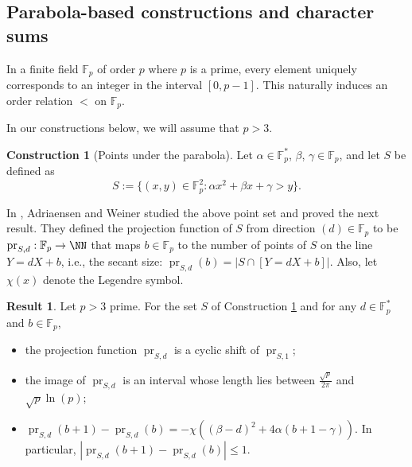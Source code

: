 \documentclass[10pt]{article}
\newcommand{\F}{\mathbb{F}}
\DeclareMathOperator{\pr}{pr}
\theoremstyle{definition}
\newtheorem{construction}[thm]{Construction}
\newtheorem{result}[thm]{Result}
\begin{document}
	\subsection[Parabola-based constructions and character sums]{ {Parabola-based constructions and character sums}}
	
	In a finite field $\F_p$ of order $p$ where $ p$ is a prime, every element uniquely corresponds to an integer in the interval $[0, p-1]$. This naturally induces an order relation $<$ on $\F_p$.
	
	In  our constructions below, we will assume that $p > 3$. %
	
	\begin{construction}[Points under the parabola]\label{parabola}
		Let  $\alpha \in \F^*_p$, $\beta$, $\gamma \in \F_p$, and let $S$ be defined as %
		\[
		S := \{(x, y) \in \F_p^2 : \alpha x^2 + \beta x + \gamma  > y \} .
		\]%
	\end{construction}
	
	In \cite{AW}, Adriaensen and Weiner studied the above point set and proved the next result. They defined the projection function of $S$ from direction $(d) \in \F_p$ to be $\pr_{S,d}:\F_p \to \NN$ that maps $b \in \F_p$ to the number of points of $S$ on the line $Y=dX+b$, i.e., the secant size: $\pr_{S,d}(b)=|S\cap [Y=dX+b]|$.
	Also, let $\chi(x)$ denote the Legendre symbol.%
	\begin{result}
		\label{res: parabola}
		Let $p>3$ prime. For the set $S$ of Construction \ref{parabola} and for any $d \in \F_p^*$ and $b \in \F_p$, 
		\begin{itemize}
			\item[(1)]{the projection function $\pr_{S,d}$ is a cyclic shift of $\pr_{S,1}$;}
			\item[(2)]{the image of $\pr_{S,d}$ is an interval whose length lies between $\frac{\sqrt p}{2 \pi}$ and $\sqrt p \ln(p)$;}
			\item[(3)]{
				$\pr_{S,d}(b+1)-\pr_{S,d}(b) = -\chi( (\beta-d)^2 + 4\alpha(b+1-\gamma) )$.
			} In particular, $|\pr_{S,d}(b+1)-\pr_{S,d}(b)|\le 1$.
		\end{itemize}
	\end{result}
	
\end{document}
